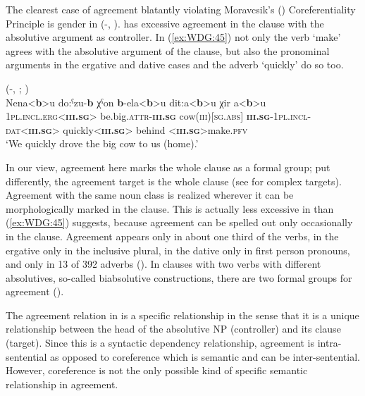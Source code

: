 \documentclass[output=collectionpaper]{langsci/langscibook}
\begin{document}
The clearest case of agreement blatantly violating Moravcsik's (\citealt*[363]{Moravcsik1978}) Coreferentiality Principle is gender in  (-, ).  has excessive agreement in the clause with the absolutive argument as controller. In (\ref{ex:WDG:45}) not only the verb `make' agrees with the absolutive argument of the clause, but also the pronominal arguments in the ergative and dative cases and the adverb `quickly' do so too.

\ea\label{ex:WDG:45}
 (-, ; \citealt[3]{Bond2016})\\
\gll Nena<\textbf{b}>u	do:ˁzu-\textbf{b}	χˁon \textbf{b}-ela<\textbf{b}>u	dit:a<\textbf{b}>u	χir	a<\textbf{b}>u\\
\textsc{1pl.incl.erg}<\textbf{\textsc{iii.sg}}>	be.big.\textsc{attr}-\textbf{\textsc{iii.sg}}	cow(\textsc{iii})[\textsc{sg.abs}] \textbf{\textsc{iii.sg}}-\textsc{1pl.incl-dat}<\textbf{\textsc{iii.sg}}>	quickly<\textbf{\textsc{iii.sg}}>	behind	<\textbf{\textsc{iii.sg}}>make.\textsc{pfv} \\
\glt `We quickly drove the big cow to us (home).'\\
\z

In our view, agreement here marks the whole clause as a formal group; put differently, the agreement target is the whole clause (see  for complex targets). Agreement with the same noun class is realized wherever it can be morphologically marked in the clause. This is actually less excessive in  than (\ref{ex:WDG:45}) suggests, because agreement can be spelled out only occasionally in the  clause. Agreement appears only in about one third of the verbs, in the ergative only in the inclusive plural, in the dative only in first person pronouns, and only in 13 of 392 adverbs (\citealt[70]{Bond2016}). In clauses with two verbs with different absolutives, so-called biabsolutive constructions, there are two formal groups for agreement (\citealt[90--111]{Chumakina2016}).

The agreement relation in  is a specific relationship in the sense that it is a unique relationship between the head of the absolutive NP (controller) and its clause (target). Since this is a syntactic dependency relationship,  agreement is intra-sentential as opposed to coreference which is semantic and can be inter-sentential. However, coreference is not the only possible kind of specific semantic relationship in agreement.
\end{document}

